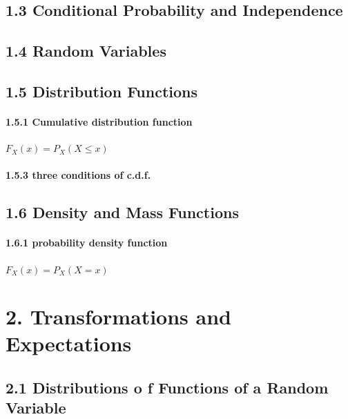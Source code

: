\documentclass[6pt,twocolumn,Portrait]{article}
\let\oldparagraph\paragraph
\renewcommand{\paragraph}[1]{\oldparagraph{#1}\mbox{}}
\begin{document}
\hypertarget{conditional-probability-and-independence}{%
\subsection{1.3 Conditional Probability and
Independence}\label{conditional-probability-and-independence}}

\hypertarget{random-variables}{%
\subsection{1.4 Random Variables}\label{random-variables}}

\hypertarget{distribution-functions}{%
\subsection{1.5 Distribution Functions}\label{distribution-functions}}

\hypertarget{CDF}{%
\paragraph{1.5.1 Cumulative distribution function}\label{CDF}}

\(F_X(x)=P_X(X\le x)\)

\hypertarget{cdfP}{%
\paragraph{1.5.3 three conditions of c.d.f.}\label{cdfP}}

\hypertarget{density-and-mass-functions}{%
\subsection{1.6 Density and Mass
Functions}\label{density-and-mass-functions}}

\hypertarget{PDF}{%
\paragraph{1.6.1 probability density function}\label{PDF}}

\(F_X(x)=P_X(X= x)\)

\hypertarget{transformations-and-expectations}{%
\section{2. Transformations and
Expectations}\label{transformations-and-expectations}}

\hypertarget{distributions-o-f-functions-of-a-random-variable}{%
\subsection{2.1 Distributions o f Functions of a Random
Variable}\label{distributions-o-f-functions-of-a-random-variable}}
\end{document}
